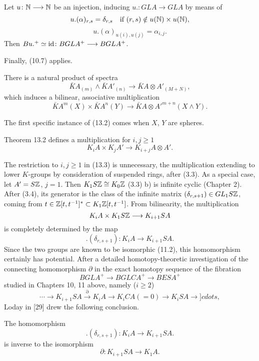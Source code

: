 \begin{lemma}
  Let $u \colon  \mathbb{N}\longrightarrow \mathbb{N}$ be an injection, inducing $u. \colon  GLA\longrightarrow GLA$ by means of
  \[u.(\alpha)_{r,s} = \delta_{r,s} \quad \mbox{if } (r, s) \notin u(\mathbb{N}) \times u(\mathbb{N}),\]
  \[u.(\alpha)_{u(i),u(j)} = \alpha_{i,j}.\]
Then $Bu.^+ \simeq \mathrm{id} \colon  BGLA^+ \longrightarrow BGLA^+ $.
\end{lemma}
Finally, (10.7) applies.
\begin{theorem}
  There is a natural product of spectra
  \[\bar{K}A_{(m)}\wedge \bar{K}A'_{(n)} \longrightarrow \bar{K}A \otimes A'_{(M+N)},\]
which induces a bilinear, associative multiplication
\[\bar{K}A^m(X) \times \bar{K}A^n(Y) \longrightarrow \bar{K}A \otimes {A'}^{m+n}(X \wedge Y).\]
\end{theorem}
The first specific instance of (13.2) comes when $X$, $Y$ are spheres.
\begin{corollary}
  Theorem 13.2 defines a multiplication for $i,j\geqslant 1$
  \[K_iA \times K_jA'\longrightarrow K_{i+j}A\otimes A'.\]
\end{corollary}
The restriction to $i, j \geqslant 1$ in (13.3) is unnecessary, the multiplication extending to lower $K$-groups by consideration of suspended rings, after (3.3). As a special case, let $A' = S\mathbb{Z}$, $j = 1$. Then $K_1 S\mathbb{Z} \cong K_0\mathbb{Z}$ (3.3) b) is infinite cyclic (Chapter 2). After (3.4), its generator is the class of the infinite matrix $(\delta_{r ,s+1}) \in GL_1 S\mathbb{Z}$, coming from $t \in \mathbb{Z}[t, t^{-1}]^* \subset K_1 \mathbb{Z}[t, t^{-1}]$. From bilinearity, the multiplication
\[K_i A\times K_1S\mathbb{Z}\longrightarrow K_{i+1}SA\]
is completely determined by the map
\[.(\delta_{r,s+1})\colon K_i A\longrightarrow K_{i+1}SA.\]
Since the two groups are known to be isomorphic (11.2), this homomorphism certainly has potential. After a detailed homotopy-theoretic investigation of the connecting homomorphism $\partial$ in the exact homotopy sequence of the fibration
\[BGLA^+ \longrightarrow BGLCA^+ \longrightarrow BESA^+\]
studied in Chapters 10, 11 above, namely ($i \geqslant 2$)
\[\cdots \longrightarrow K_{i+1}SA \overset{\partial}{\longrightarrow} K_iA \longrightarrow K_iCA (= 0) \longrightarrow K_iSA \longrightarrow ]cdots ,\]
Loday in [29] drew the following conclusion.
\begin{prop}
  The homomorphism
  \[.(\delta_{r,s+1})\colon  K_i A\longrightarrow K_{i+1}SA.\]
is inverse to the isomorphism
\[\partial\colon K_{i+1}SA \longrightarrow K_1 A.\]
\end{prop}
